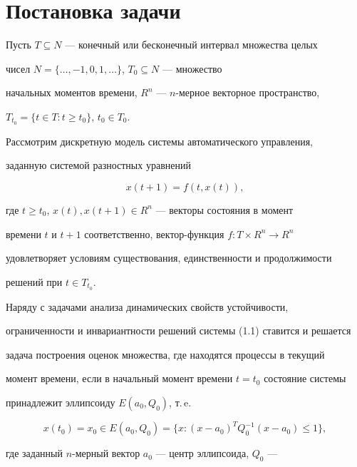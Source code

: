 \section{Постановка задачи}





Пусть $T\subseteq N$ --- конечный или бесконечный интервал множества целых


чисел $N=\{\dotsc,-1,0,1,\dotsc\}$, $T_0\subseteq N$ --- множество


начальных моментов времени, $R^n$ --- $n$-мерное векторное пространство,


$T_{t_0}=\{t\in T: t\ge t_0\}$, $t_0\in T_0$.





Рассмотрим дискретную модель системы автоматического управления,


заданную системой разностных уравнений


\begin{equation}


x(t+1)=f(t,x(t)),


\end{equation}


где $t\ge t_0$, $x(t),x(t+1)\in R^n$ --- векторы состояния в момент


времени $t$ и $t+1$ соответственно, вектор-функция $f:T\times R^n\to R^n$


удовлетворяет условиям существования, единственности и продолжимости


решений при $t\in T_{t_0}$.





Наряду с задачами анализа динамических свойств устойчивости,


ограниченности и инвариантности решений системы (1.1) ставится и решается


задача построения оценок множества, где находятся процессы в текущий


момент времени, если в начальный момент времени $t=t_0$ состояние системы


принадлежит эллипсоиду $E(a_0,Q_0)$, т.\,e.


\begin{equation}


x(t_0)=x_0\in E(a_0,Q_0)=\{x:(x-a_0)^T Q^{-1}_0(x-a_0)\le1\},


\end{equation}


где заданный $n$-мерный вектор $a_0$ --- центр эллипсоида, $Q_0$ ---



